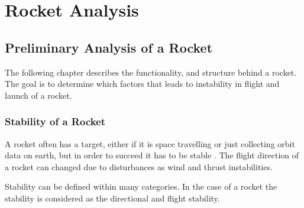 %
%
%
%


\chapter{Rocket Analysis}

\section{Preliminary Analysis of a Rocket}\label{sec:PRocketAnalysis}
The following chapter describes the functionality,  and structure behind a rocket. The goal is to determine which factors that leads to instability in flight and launch of a rocket. 


\subsection{Stability of a Rocket}
\graphicspath{{figures/"Preanalysis&Requirement"/RocketStability/}}
A rocket often has a target, either if it is space travelling or just collecting orbit data on earth, but in order to succeed it has to be stable \cite{web:rocketnasa}. The flight direction of a rocket can changed due to disturbances as wind and thrust instabilities.   

Stability can be defined within many categories. In the case of a rocket the stability is considered as the directional and flight stability.  

